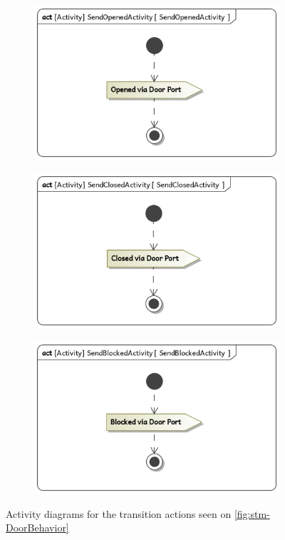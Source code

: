\documentclass[a4paper]{article}
\begin{document}
\begin{figure}[hb]
	\begin{subfigure}{.33\textwidth}
		\includegraphics[width=\textwidth]
		{stm-DoorBehavior-SendOpenedActivity.jpg}
	\end{subfigure}
	\begin{subfigure}{.33\textwidth}
		\includegraphics[width=\textwidth]
		{stm-DoorBehavior-SendClosedActivity.jpg}
	\end{subfigure}
	\begin{subfigure}{.33\textwidth}
		\includegraphics[width=\textwidth]
		{stm-DoorBehavior-SendBlockedActivity.jpg}
	\end{subfigure}
	\caption{Activity diagrams for the transition actions seen on
		\cref{fig:stm-DoorBehavior}}%
	\label{fig:stm-DoorBehavior-actions}
\end{figure}
\end{document}
